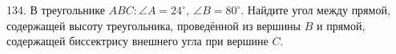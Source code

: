 134. В треугольнике $ABC: \angle A=24^\circ,\ \angle B=80^\circ.$ Найдите угол между прямой, содержащей высоту треугольника, проведённой из вершины $B$ и прямой, содержащей биссектрису внешнего угла при вершине $C.$\\
